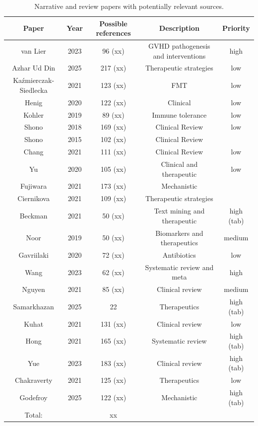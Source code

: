 \documentclass[11pt,a4paper]{article}
\begin{document}
\begin{table}[htbp]
\centering
\caption{\label{tab:tier4tab} Narrative and review papers with potentially relevant sources.}

\begin{tabular}{ccccc}
\\ \hline
Paper & Year  & Possible references &   Description & Priority\\
\hline
van Lier & 2023 & 96 (xx) & GVHD pathogenesis and interventions & high \\
Azhar Ud Din & 2025 & 217 (xx)& Therapeutic strategies & low\\
Kaźmierczak-Siedlecka & 2021 & 123 (xx) & FMT  & low\\
Henig & 2020 & 122 (xx) & Clinical & low\\
Kohler & 2019 & 89 (xx) & Immune tolerance & low\\
Shono & 2018 & 169 (xx) & Clinical Review & low\\
Shono & 2015 & 102 (xx) & Clinical Review \\
Chang & 2021 & 111 (xx) & Clinical Review & low \\
Yu & 2020 & 105 (xx) & Clinical and therapeutic & low \\
Fujiwara & 2021 & 173 (xx) & Mechanistic \\
Ciernikova & 2021 &  109 (xx) & Therapeutic strategies \\
Beckman & 2021 & 50 (xx) & Text mining and therapeutic & high (tab) \\
Noor & 2019 & 50 (xx) & Biomarkers and therapeutics & medium \\
Gavriilaki & 2020 & 72 (xx) & Antibiotics & low \\
Wang & 2023 & 62 (xx) & Systematic review and meta & high  \\
Nguyen & 2021 & 85 (xx) & Clinical review & medium \\
Samarkhazan & 2025 & 22 & Therapeutics & high (tab) \\
Kuhat & 2021 & 131 (xx) & Clinical review & low \\
Hong & 2021 & 165 (xx) & Systematic review & high (tab)\\
Yue & 2023 & 183 (xx) & Clinical review & high (tab)\\
Chakraverty & 2021 & 125 (xx) & Therapeutics & low \\
Godefroy & 2025 & 122 (xx) & Mechanistic & high (tab)\\
\hline
Total: &  & xx &  \\

\hline
\end{tabular}
\end{table}
\end{document}
